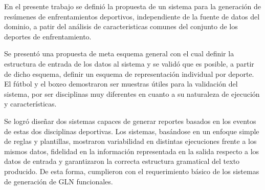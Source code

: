 \begin{conclusions}
    En el presente trabajo se definió la propuesta de un sistema para la 
generación de resúmenes de enfrentamientos deportivos, independiente de la fuente de datos del dominio, a
patir del análisis de caracteristicas comunes del conjunto de los deportes de enfrentamiento.

Se presentó una propuesta de meta esquema general con el cual definir la estructura de entrada de
los datos al sistema y se validó que es posible, a partir de dicho esquema,  definir un esquema de representación individual por deporte. 
El fútbol y el boxeo demostraron ser muestras útiles para la validación del sistema, por ser disciplinas muy diferentes en cuanto a su naturaleza de 
ejecución y características.

 Se logró diseñar dos sistemas capaces de generar reportes basados en los eventos de estas dos
disciplinas deportivas. Los sistemas, basándose  en un enfoque simple de reglas y plantillas, mostraron variabilidad en distintas ejecuciones frente a los 
mismos datos, fidelidad en la información representada en la salida  respecto a los datos de entrada y garantizaron la correcta estructura gramatical del
texto producido. De esta forma, cumplieron con el requerimiento básico de los sistemas de generación de GLN funcionales.

    

\end{conclusions}


